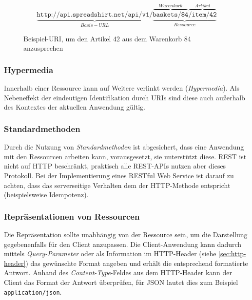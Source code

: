 \begin{figure}
    \centering
    \[
        \underbrace{\texttt{http://api.spreadshirt.net/api/v1/}}_{Basis-URL}\underbrace{\overbrace{\texttt{baskets/84}}^{Warenkorb}\overbrace{\texttt{/item/42}}^{Artikel}}_{Ressource}
    \]
    \caption{Beispiel-\gls{URI}, um den Artikel 42 aus dem Warenkorb 84 anzusprechen}
    \label{fig:RESTexampleURI}
\end{figure}

\subsubsection{Hypermedia}
\label{sec:hypermedia}

Innerhalb einer Ressource kann auf Weitere verlinkt werden (\emph{Hypermedia}). Als Nebeneffekt der eindeutigen Identifikation durch \glspl{URI} sind diese auch außerhalb des Kontextes der aktuellen Anwendung gültig. 


\subsubsection{Standardmethoden}
\label{sec:standardmethods}

Durch die Nutzung von \emph{Standardmethoden} ist abgesichert, dass eine Anwendung mit den Ressourcen arbeiten kann, vorausgesetzt, sie unterstützt diese. \gls{REST} ist nicht auf \gls{HTTP} beschränkt, praktisch alle \gls{REST}-\glspl{API} nutzen aber dieses Protokoll. Bei der Implementierung eines \gls{RESTful} Web Service ist darauf zu achten, dass das serverseitige Verhalten dem der HTTP-Methode entspricht (beispielsweise Idempotenz).

\subsubsection{Repräsentationen von Ressourcen}
\label{sec:representationofresources}

Die Repräsentation sollte unabhängig von der Ressource sein, um die Darstellung gegebenenfalls für den Client anzupassen. 
Die Client-Anwendung kann dadurch mittels \emph{Query-Parameter} oder als Information im \gls{HTTP}-Header (siehe \cref{sec:http-header}) das gewünschte Format angeben und erhält die entsprechend formatierte Antwort.
Anhand des \emph{Content-Type}-Feldes aus dem \gls{HTTP}-Header kann der Client das Format der Antwort überprüfen, für \gls{JSON} lautet dies zum Beispiel \texttt{application/json}.

